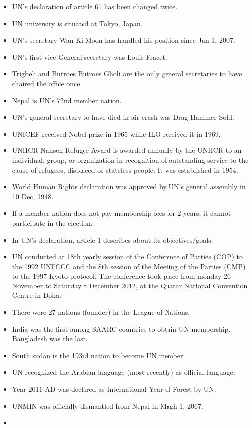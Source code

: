 \documentclass[
  openany]{book}
\begin{document}
\begin{itemize}
\item
  UN's declaration of article 61 has been changed twice.
\item
  UN university is situated at Tokyo, Japan.
\item
  UN's secretary Wan Ki Moon has handled his position since Jan 1, 2007.
\item
  UN's first vice General secretary was Louis Fracet.
\item
  Trigbeli and Butroes Butroes Gholi are the only general secretaries to have chaired the office once.
\item
  Nepal is UN's 72nd member nation.
\item
  UN's general secretary to have died in air crash was Drag Hammer Sold.
\item
  UNICEF received Nobel prize in 1965 while ILO received it in 1969.
\item
  UNHCR Nansen Refugee Award is awarded annually by the UNHCR to an individual, group, or organization in recognition of outstanding service to the cause of refugees, displaced or stateless people. It was established in 1954.
\item
  World Human Rights declaration was approved by UN's general assembly in 10 Dec, 1948.
\item
  If a member nation does not pay membership fees for 2 years, it cannot participate in the election.
\item
  In UN's declaration, article 1 describes about its objectives/goals.
\item
  UN conducted at 18th yearly session of the Conference of Parties (COP) to the 1992 UNFCCC and the 8th session of the Meeting of the Parties (CMP) to the 1997 Kyoto protocol. The conference took place from monday 26 November to Saturday 8 December 2012, at the Quatar National Convention Centre in Doha.
\item
  There were 27 nations (founder) in the League of Nations.
\item
  India was the first among SAARC countries to obtain UN membership. Bangladesh was the last.
\item
  South sudan is the 193rd nation to become UN member.
\item
  UN recognized the Arabian language (most recently) as official language.
\item
  Year 2011 AD was declared as International Year of Forest by UN.
\item
  UNMIN was officially dismantled from Nepal in Magh 1, 2067.
\item

\end{itemize}
\end{document}
